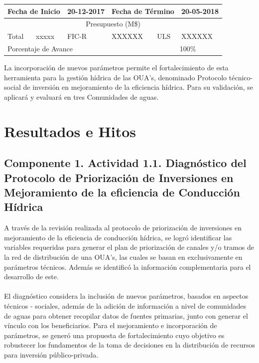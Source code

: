 \documentclass[]{article}
\begin{document}
\begin{table}[!htb]
\centering
\begin{tabular}{|p{2cm}|p{2cm}|p{2cm}|p{2cm}|p{2cm}|p{2cm}|}
    \hline
    \multicolumn{2}{|l|}{Fecha de Inicio} & 20-12-2017 & \multicolumn{2}{l|}{Fecha de Término} & 20-05-2018\\
    \hline
    \multicolumn{6}{|c|}{Presupuesto (M\$)}\\
    \hline
    Total & xxxxx & FIC-R & XXXXXX & ULS & XXXXXX\\
    \hline
    \multicolumn{4}{|l|}{Porcentaje de Avance} & \multicolumn{2}{c|}{100\%}\\
    \hline
\end{tabular}
\end{table}

La incorporación de nuevos parámetros permite el fortalecimiento de esta herramienta para la gestión hídrica de las OUA's, denominado Protocolo técnico-social de inversión en mejoramiento de la eficiencia hídrica. Para su validación, se aplicará y evaluará en tres Comunidades de aguas.

\clearpage
\section{Resultados e Hitos}

\subsection{Componente 1. Actividad 1.1. Diagnóstico del Protocolo de Priorización de Inversiones en Mejoramiento de la eficiencia de Conducción Hídrica}

A través de la revisión realizada al protocolo de priorización de inversiones en mejoramiento de la eficiencia de conducción hídrica, se logró identificar las variables requeridas para generar el plan de priorización de canales y/o tramos de la red de distribución de una OUA's, las cuales se basan en exclusivamente en parámetros técnicos. Además se identificó la información complementaria para el desarrollo de este.\\
\\
El diagnóstico considera la inclusión de nuevos parámetros, basados en aspectos técnicos - sociales, además de la adición de información a nivel de comunidades de aguas para obtener recopilar datos de fuentes primarias, junto con generar el vínculo con los beneficiarios. Para el mejoramiento e incorporación de parámetros, se generó una propuesta de fortalecimiento cuyo objetivo es robustecer los fundamentos de la toma de decisiones en la distribución de recursos para inversión público-privada.
\end{document}
